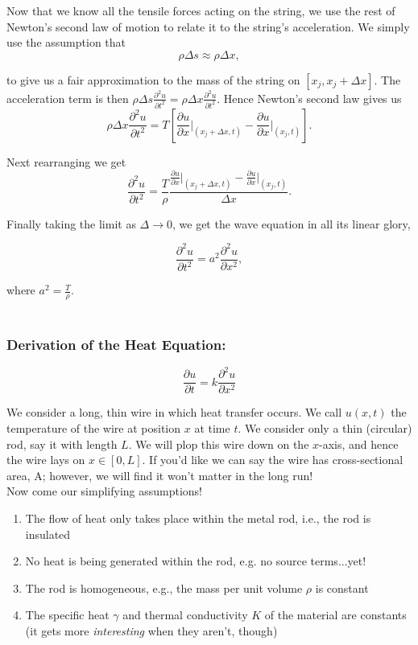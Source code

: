 Now that we know all the tensile forces acting on the string, we use the rest of Newton's second law of motion to relate it to the string's acceleration. We simply use the assumption that $$\rho \Delta s \approx \rho \Delta x,$$

to give us a fair approximation to the mass of the string on $[x_j,x_j+\Delta x]$. The acceleration term is then $\rho\Delta s \frac{\partial^2 u}{\partial t^2} = \rho\Delta x \frac{\partial^2 u}{\partial t^2}$. Hence Newton's second law gives us
$$\rho\Delta x \frac{\partial^2 u}{\partial t^2} =  T\left[ \frac{\partial u}{\partial x}\Big|_{(x_j+\Delta x, t)}  -  \frac{\partial u}{\partial x}\Big|_{(x_j, t)}    \right].$$

Next rearranging we get $$\frac{\partial^2 u}{\partial t^2} = \frac{T}{\rho} \frac{\frac{\partial u}{\partial x}\Big|_{(x_j+\Delta x, t)}  -  \frac{\partial u}{\partial x}\Big|_{(x_j, t)} }{\Delta x}.$$

Finally taking the limit as $\Delta \rightarrow 0$, we get the wave equation in all its linear glory,

$$\frac{\partial^2 u}{\partial t^2} = a^2 \frac{\partial^2 u}{\partial x^2},$$

where $a^2 = \frac{T}{\rho}.$ \\ \\

%
%
\subsubsection{Derivation of the Heat Equation:}  $$\frac{\partial u}{\partial t} = k \frac{\partial^2 u}{\partial x^2}$$

We consider a long, thin wire in which heat transfer occurs. We call $u(x,t)$ the temperature of the wire at position $x$ at time $t$. We consider only a thin (circular) rod, say it with length $L$. We will plop this wire down on the $x$-axis, and hence the wire lays on $x\in[0,L]$. If you'd like we can say the wire has cross-sectional area, A; however, we will find it won't matter in the long run!\\

Now come our simplifying assumptions!
\begin{enumerate}
\item The flow of heat only takes place within the metal rod, i.e., the rod is insulated
\item No heat is being generated within the rod, e.g. no source terms...yet!
\item The rod is homogeneous, e.g., the mass per unit volume $\rho$ is constant
\item The specific heat $\gamma$ and thermal conductivity $K$ of the material are constants (it gets more \emph{interesting} when they aren't, though)
\end{enumerate}

